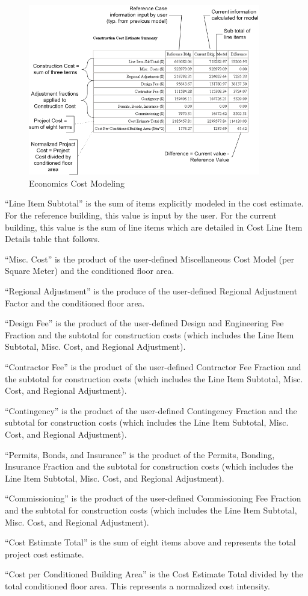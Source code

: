 \begin{figure}[hbtp] %
\centering
\includegraphics[width=0.9\textwidth, height=0.9\textheight, keepaspectratio=true]{media/image616.png}
\caption{Economics Cost Modeling \protect \label{fig:economics-cost-modeling}}
\end{figure}

``Line Item Subtotal'' is the sum of items explicitly modeled in the cost estimate. For the reference building, this value is input by the user. For the current building, this value is the sum of line items which are detailed in Cost Line Item Details table that follows.

``Misc. Cost'' is the product of the user-defined Miscellaneous Cost Model (per Square Meter) and the conditioned floor area.

``Regional Adjustment'' is the produce of the user-defined Regional Adjustment Factor and the conditioned floor area.

``Design Fee'' is the product of the user-defined Design and Engineering Fee Fraction and the subtotal for construction costs (which includes the Line Item Subtotal, Misc. Cost, and Regional Adjustment).

``Contractor Fee'' is the product of the user-defined Contractor Fee Fraction and the subtotal for construction costs (which includes the Line Item Subtotal, Misc. Cost, and Regional Adjustment).

``Contingency'' is the product of the user-defined Contingency Fraction and the subtotal for construction costs (which includes the Line Item Subtotal, Misc. Cost, and Regional Adjustment).

``Permits, Bonds, and Insurance'' is the product of the Permits, Bonding, Insurance Fraction and the subtotal for construction costs (which includes the Line Item Subtotal, Misc. Cost, and Regional Adjustment).

``Commissioning'' is the product of the user-defined Commissioning Fee Fraction and the subtotal for construction costs (which includes the Line Item Subtotal, Misc. Cost, and Regional Adjustment).

``Cost Estimate Total'' is the sum of eight items above and represents the total project cost estimate.

``Cost per Conditioned Building Area'' is the Cost Estimate Total divided by the total conditioned floor area. This represents a normalized cost intensity.

